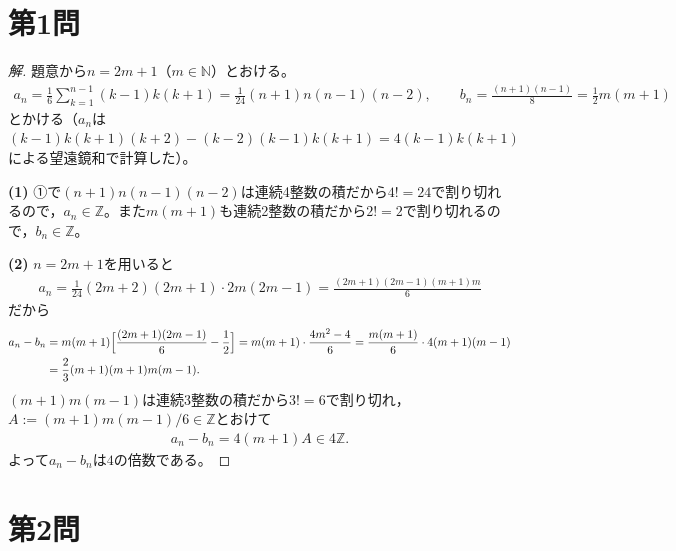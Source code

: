 \documentclass[../main.tex]{subfiles}
\begin{document}
\section*{第1問}

\begin{proof}[解]
  題意から$n=2m+1$（$m\in\mathbb N$）とおける。
  \begin{align*}
    a_n=\frac16\sum_{k=1}^{n-1}(k-1)k(k+1)=\frac1{24}(n+1)n(n-1)(n-2),\qquad
    b_n=\frac{(n+1)(n-1)}8=\frac12m(m+1)\tag{①}
  \end{align*}
  とかける（$a_n$は$(k-1)k(k+1)(k+2)-(k-2)(k-1)k(k+1)=4(k-1)k(k+1)$による望遠鏡和で計算した）。

  \textbf{(1)} ①で$(n+1)n(n-1)(n-2)$は連続4整数の積だから$4!=24$で割り切れるので，$a_n\in\mathbb Z$。また$m(m+1)$も連続2整数の積だから$2!=2$で割り切れるので，$b_n\in\mathbb Z$。

  \textbf{(2)} $n=2m+1$を用いると
  \begin{align*}
    a_n=\frac1{24}(2m+2)(2m+1)\cdot2m(2m-1)=\frac{(2m+1)(2m-1)(m+1)m}6
  \end{align*}
  だから
  \begin{align*}
    a_n-b_n&=m(m+1)\Bigl[\frac{(2m+1)(2m-1)}6-\frac12\Bigr]=m(m+1)\cdot\frac{4m^2-4}6=\frac{m(m+1)}6\cdot4(m+1)(m-1)\\
    &=\frac23(m+1)(m+1)m(m-1).
  \end{align*}
  $(m+1)m(m-1)$は連続3整数の積だから$3!=6$で割り切れ，$A:=(m+1)m(m-1)/6\in\mathbb Z$とおけて
  \begin{align*}
    a_n-b_n=4(m+1)A\in4\mathbb Z.
  \end{align*}
  よって$a_n-b_n$は$4$の倍数である。
\end{proof}

\newpage

\section*{第2問}
\end{document}
